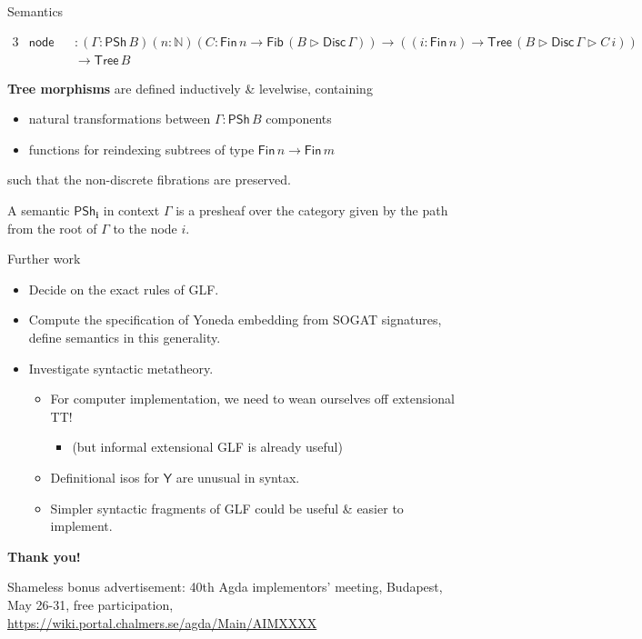 \documentclass[dvipsnames,aspectratio=169]{beamer}
\newcommand{\ms}[1]{\mathsf{#1}}
\newcommand{\mbb}[1]{\mathbb{#1}}
\newcommand{\bs}[1]{\boldsymbol{#1}}
\newcommand{\Y}{\mathsf{Y}}
\newcommand{\Fib}{\mathsf{Fib}}
\newcommand{\Fin}{\mathsf{Fin}}
\newcommand{\Tree}{\mathsf{Tree}}
\newcommand{\Disc}{\mathsf{Disc}}
\newcommand{\PSh}{\mathsf{PSh}}
\newcommand{\ext}{\triangleright}
\begin{document}
\begin{frame}{Semantics}
\begin{block}{}
\vspace{-1em}
{\small
\begin{alignat*}{3}
  & \ms{node} &&: (\Gamma : \PSh\,B)(n : \mbb{N})(C : \Fin\,n \to \Fib\,(B \ext \Disc\,\Gamma)) \to ((i : \Fin\,n) \to \Tree\,(B \ext \Disc\,\Gamma \ext C\,i)) \\
  & &&\to \Tree\,B
\end{alignat*}
}
\end{block}
\vspace{2em}
\textbf{Tree morphisms} are defined inductively \& levelwise, containing
\begin{itemize}
\item natural transformations between $\Gamma : \PSh\,B$ components
\item functions for reindexing subtrees of type $\Fin\,n \to \Fin\,m$
\end{itemize}
such that the non-discrete fibrations are preserved.
\vspace{1em}

A semantic $\bs{\PSh_i}$ in context $\Gamma$ is a presheaf over the category given by the path from the root of $\Gamma$ to the node $i$.
\vspace{6em}
\end{frame}

\begin{frame}{Further work}

\begin{itemize}
\item Decide on the exact rules of GLF.
\item Compute the specification of Yoneda embedding from SOGAT signatures,
      define semantics in this generality.
\item Investigate syntactic metatheory.
  \begin{itemize}
    \item For computer implementation, we need to wean ourselves off extensional TT!
      \begin{itemize}
        \item (but informal extensional GLF is already useful)
      \end{itemize}
    \item Definitional isos for $\Y$ are unusual in syntax.
    \item Simpler syntactic fragments of GLF could be useful \& easier to implement.
  \end{itemize}
\end{itemize}
\vspace{0.6em}
\pause

\begin{center}
  \Large{\textbf{Thank you!}}
\end{center}
\vspace{1em}

\small
{Shameless bonus advertisement: 40th Agda implementors' meeting, Budapest, May 26-31, free participation,
\url{https://wiki.portal.chalmers.se/agda/Main/AIMXXXX}}


\end{frame}
\end{document}
